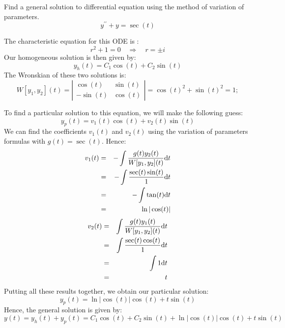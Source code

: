 \documentclass[11pt]{article}
\begin{document}
\begin{problem}
Find a general solution to differential equation using the method of variation of parameters.
\begin{equation*}
y^{\prime \prime} + y = \sec(t)
\end{equation*}
\end{problem}
\begin{solution}
The characteristic equation for this ODE is :
\begin{equation*}
r^2 +1 =0 \quad \Rightarrow \quad r = \pm i
\end{equation*}
Our homogeneous solution is then given by:
\begin{equation*}
y_{h}(t) = C_{1} \cos(t) + C_{2} \sin(t)
\end{equation*}
The Wronskian of these two solutions is:
\begin{equation*}
W[y_{1},y_{2}](t) = \left| \begin{array}{cc} \cos(t) & \sin(t) \\
-\sin(t) & \cos(t) \end{array} \right| = \cos(t)^2 + \sin(t)^2 =1;
\end{equation*}

To find a particular solution to this equation, we will make the following guess:
\begin{equation*}
y_{p}(t) = v_{1}(t) \cos(t) + v_{2}(t) \sin(t)
\end{equation*}
We can find the coefficients $v_{1}(t)$ and $v_{2}(t)$ using the variation of parameters formulas with $g(t) = \sec(t)$.
Hence:
\begin{eqnarray*}
v_{1}(t) & = & - \int \dfrac{g(t) y_{2}(t)}{W[y_{1},y_{2}](t)} {\rm d} t \\
& = & - \int \dfrac{\sec(t) \sin(t)}{1} {\rm d} t \\
& = & - \int \tan(t) {\rm d} t \\
& = & \ln|\cos(t)| \\
\end{eqnarray*}
\begin{eqnarray*}
v_{2}(t) & = &  \int \dfrac{g(t) y_{1}(t)}{W[y_{1},y_{2}](t)} {\rm d} t \\
& = &  \int \dfrac{\sec(t) \cos(t)}{1} {\rm d} t \\
& = & \int 1 {\rm d} t \\
& = & t \\
\end{eqnarray*}
Putting all these results together, we obtain our particular solution:
\begin{equation*}
y_{p}(t) = \ln|\cos(t)| \cos(t) + t \sin(t)
\end{equation*}
Hence, the general solution is given by:
\begin{equation*}
\boxed{y(t) = y_{h}(t) + y_{p}(t) = C_{1} \cos(t) + C_{2} \sin(t)+ \ln|\cos(t)| \cos(t) + t \sin(t)}
\end{equation*}
\end{solution}
\end{document}
